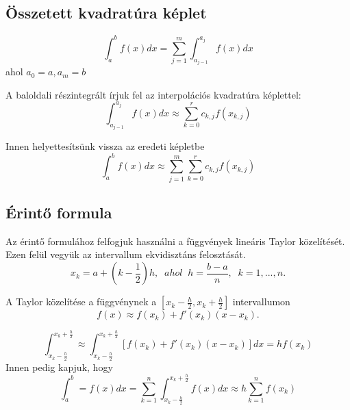 \documentclass{article}
\theoremstyle{definition}
\theoremstyle{theorem}
\begin{document}
\subsection{Összetett kvadratúra képlet}

\begin{equation*}
 \int_a^{b} f(x) dx = \sum_{j = 1} ^{m} \int_{a_{j-1}} ^{a_j} f(x) dx 
\end{equation*}
 ahol $a_0 = a, a_m =b $  

A baloldali részintegrált írjuk fel az interpolációs kvadratúra képlettel:
\begin{equation*}
\int_{a_{j-1}}^{a_j} f(x) dx \approx \sum_{k=0}^{r} c_{k,j}f(x_{k,j})
\end{equation*}

Innen helyettesítsünk vissza az eredeti képletbe
\begin{equation*}
\int_a^b f(x) dx \approx \sum_{j=1}^{m} \sum_{k=0}^{r} c_{k,j} f(x_{k,j})
\end{equation*}


\subsection{Érintő formula}

Az érintő formulához felfogjuk használni a függvények lineáris Taylor közelítését. Ezen felül vegyük az intervallum ekvidisztáns felosztását.
\begin{equation*}
   x_k = a + (k - \frac{1}{2})h ,\;\; ahol\;\; h = \frac{b-a}{n},\;\; k =1,...,n. 
\end{equation*}



A Taylor közelítése a függvénynek a $[x_k-\frac{h}{2},x_k+\frac{h}{2}]$ intervallumon
\begin{equation*}
    f(x) \approx f(x_k)+f'(x_k)(x-x_k).
\end{equation*}

\begin{equation*}
\int_{x_k-\frac{h}{2}}^{x_k + \frac{h}{2}} \approx \int_{x_k - \frac{h}{2}}^{x_k + \frac{h}{2}} [f(x_k) + f'(x_k)(x-x_k)] dx = hf(x_k)
\end{equation*}
\newline
Innen pedig kapjuk, hogy
\begin{equation*}
\int_a^b = f(x) dx = \sum_{k=1}^n \int_{x_k - \frac{h}{2}}^{x_k + \frac{h}{2}} f(x)dx \approx h \sum_{k=1}^n f(x_k)
\end{equation*}
\end{document}

